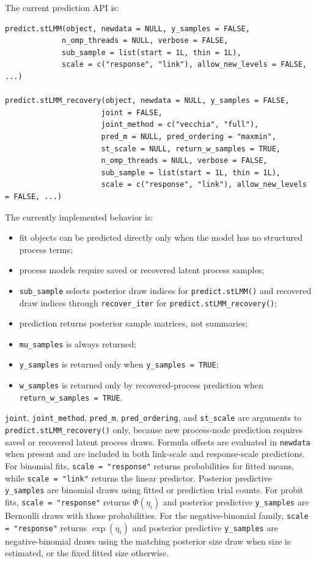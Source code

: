 \documentclass[11pt]{article}
\begin{document}
The current prediction API is:
\begin{verbatim}
predict.stLMM(object, newdata = NULL, y_samples = FALSE,
             n_omp_threads = NULL, verbose = FALSE,
             sub_sample = list(start = 1L, thin = 1L),
             scale = c("response", "link"), allow_new_levels = FALSE, ...)

predict.stLMM_recovery(object, newdata = NULL, y_samples = FALSE,
                      joint = FALSE,
                      joint_method = c("vecchia", "full"),
                      pred_m = NULL, pred_ordering = "maxmin",
                      st_scale = NULL, return_w_samples = TRUE,
                      n_omp_threads = NULL, verbose = FALSE,
                      sub_sample = list(start = 1L, thin = 1L),
                      scale = c("response", "link"), allow_new_levels = FALSE, ...)
\end{verbatim}

The currently implemented behavior is:
\begin{itemize}
\item fit objects can be predicted directly only when the model has no structured process terms;
\item process models require saved or recovered latent process samples;
\item \texttt{sub\_sample} selects posterior draw indices for \texttt{predict.stLMM()} and recovered draw indices through \texttt{recover\_iter} for \texttt{predict.stLMM\_recovery()};
\item prediction returns posterior sample matrices, not summaries;
\item \texttt{mu\_samples} is always returned;
\item \texttt{y\_samples} is returned only when \texttt{y\_samples = TRUE};
\item \texttt{w\_samples} is returned only by recovered-process prediction when \texttt{return\_w\_samples = TRUE}.
\end{itemize}
\texttt{joint}, \texttt{joint\_method}, \texttt{pred\_m}, \texttt{pred\_ordering}, and \texttt{st\_scale} are arguments to \texttt{predict.stLMM\_recovery()} only, because new process-node prediction requires saved or recovered latent process draws. Formula offsets are evaluated in \texttt{newdata} when present and are included in both link-scale and response-scale predictions. For binomial fits, \texttt{scale = "response"} returns probabilities for fitted means, while \texttt{scale = "link"} returns the linear predictor. Posterior predictive \texttt{y\_samples} are binomial draws using fitted or prediction trial counts. For probit fits, \texttt{scale = "response"} returns $\Phi(\eta_i)$ and posterior predictive \texttt{y\_samples} are Bernoulli draws with those probabilities. For the negative-binomial family, \texttt{scale = "response"} returns $\exp(\eta_i)$ and posterior predictive \texttt{y\_samples} are negative-binomial draws using the matching posterior size draw when size is estimated, or the fixed fitted size otherwise.
\end{document}
